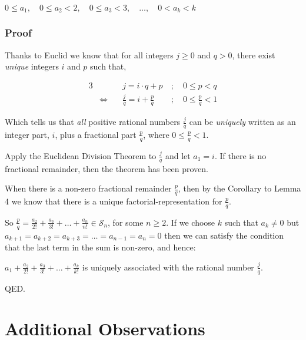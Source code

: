 \documentclass{article}
\begin{document}
{\small
\begin{center}
\(0\le{}a_1,\quad 0\le{}a_2<2,\quad 0\le{}a_3<3,\quad \dots{},\quad 0<a_k<k\)
\end{center}
}

\subsubsection*{Proof}

Thanks to Euclid we know that for all integers \(j\ge{}0\) and \(q>0\),
there exist \emph{unique} integers \(i\) and \(p\) such that,

{\small
\bgroup                                  %
\setlength{\abovedisplayskip}{0pt}       %
\begin{alignat*}{3}
&&j = i\cdot{}q + p\ &;\quad 0\le{}p<q \\
&\Leftrightarrow\quad &\frac{j}{q} = i + \frac{p}{q}\ &;\quad 0\le{}\frac{p}{q}<1
\end{alignat*}
\egroup
}\par
Which tells us that \emph{all} positive rational numbers \(\frac{j}{q}\) can be
\emph{uniquely}
written as
an integer part, \(i\), plus a fractional part \(\frac{p}{q}\), where \(0\le{}\frac{p}{q}<1\).

Apply the Euclidean Division Theorem to \(\frac{j}{q}\) and let \(a_1 = i\). If there is no fractional remainder, then
the theorem has been proven.

When there is a non-zero fractional remainder \(\frac{p}{q}\), then 
by the Corollary to Lemma 4 we know that there is a
unique factorial-representation for \(\frac{p}{q}\).

So \(\frac{p}{q} = \frac{a_2}{2!} + \frac{a_3}{3!} + \dots{} + \frac{a_n}{n!} \in \mathcal{S}_n\), for some
\(n \ge{} 2\).
If we choose \(k\) such that \(a_k \ne{} 0 \) but \(a_{k+1} =
a_{k+2} =
a_{k+3} =
\dots{} =
a_{n-1} =
a_{n} = 0\) then we can satisfy the condition that the last term in the sum is non-zero, and hence:

\(a_1 + \frac{a_2}{2!} + \frac{a_3}{3!} + \dots{} + \frac{a_k}{k!}\)
is uniquely associated with the rational number \(\frac{j}{q}\).

QED.

\break
\section*{Additional Observations}
\end{document}
